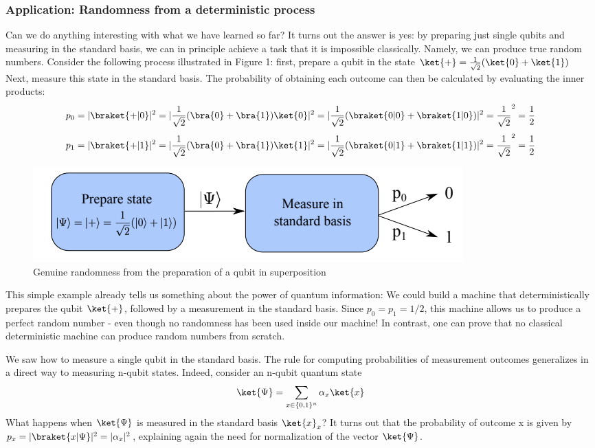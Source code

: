 \documentclass[12pt, oneside]{book}
\theoremstyle{definition}
\theoremstyle{definition}
\theoremstyle{remark}
\begin{document}
\subsubsection{Application: Randomness from a deterministic process}
Can we do anything interesting with what we have learned so far? It turns out the answer is yes:
by preparing just single qubits and measuring in the standard basis, we can in principle achieve
a task that it is impossible classically. Namely, we can produce true random numbers. Consider
the following process illustrated in Figure 1: first, prepare a qubit in the state $\ket{+}=\frac{1}{\sqrt{2}}(\ket{0}+\ket{1})$ Next, measure this state in the standard basis. The probability of obtaining each outcome can then
be calculated by evaluating the inner products:
\[
p_0=|\braket{+|0}|^2=|\frac{1}{\sqrt{2}}(\bra{0}+\bra{1})\ket{0}|^2=|\frac{1}{\sqrt{2}}(\braket{0|0}+\braket{1|0})|^2=\frac{1}{\sqrt{2}}^2=\frac{1}{2}
\]
\[
p_1=|\braket{+|1}|^2=|\frac{1}{\sqrt{2}}(\bra{0}+\bra{1})\ket{1}|^2=|\frac{1}{\sqrt{2}}(\braket{0|1}+\braket{1|1})|^2=\frac{1}{\sqrt{2}}^2=\frac{1}{2}
\]
\begin{figure}
    \centering
    \includegraphics[width=1\linewidth]{../images/randomness.png}
    \caption{Genuine randomness from the preparation of a qubit in superposition}
    \label{fig:randomness}
\end{figure}
This simple example already tells us something about the power of quantum information: We could
build a machine that deterministically prepares the qubit $\ket{+}$, followed by a measurement in the
standard basis. Since $p_0=p_1=1/2$, this machine allows us to produce a perfect random number -
even though no randomness has been used inside our machine! In contrast, one can prove that no
classical deterministic machine can produce random numbers from scratch.

We saw how to measure a single qubit in the standard basis. The rule for computing probabilities
of measurement outcomes generalizes in a direct way to measuring n-qubit states. Indeed, consider
an n-qubit quantum state
\[
\ket{\Psi}=\sum_{x\in\{0,1\}^n} \alpha_x\ket{x}
\]
What happens when $\ket{\Psi}$ is measured in the standard basis $\ket{x}_x$? It turns out that the probability
of outcome x is given by $p_x = |\braket{x|\Psi}|^2=|\alpha_x|^2$, explaining again the need for normalization of
the vector $\ket{\Psi}$.
\end{document}
